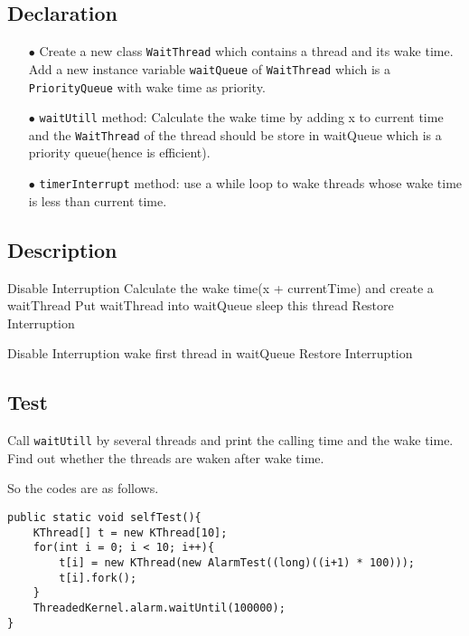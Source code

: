 \documentclass{article}
\begin{document}
\subsection{Declaration}
\begin{enumerate}
	\item[$\bullet$] Create a new class \texttt{WaitThread} which contains a thread and its wake time. 
Add a new instance variable \texttt{waitQueue} of \texttt{WaitThread} which is a \texttt{PriorityQueue} with wake time as priority. 
	\item[$\bullet$] \texttt{waitUtill} method: Calculate the wake time by adding x to current time and the \texttt{WaitThread} of the thread
		should be store in waitQueue which is a priority queue(hence is efficient).
	\item[$\bullet$] \texttt{timerInterrupt} method: use a while loop to wake threads whose wake time is less than current time.
\end{enumerate}
\subsection{Description}
\begin{algorithm}
  \begin{algorithmic}
			\State Disable Interruption
			\State Calculate the wake time(x + currentTime) and create a waitThread
			\State Put waitThread into waitQueue
			\State sleep this thread
			\State Restore Interruption
		\EndProcedure
  \end{algorithmic}
	\begin{algorithmic}
			\State Disable Interruption
					\State wake first thread in waitQueue
			\EndWhile
			\State Restore Interruption
		\EndProcedure
  \end{algorithmic}
\end{algorithm}
 \subsection{Test}
 Call \texttt{waitUtill} by several threads and print the calling time and the wake time. Find out whether the threads are waken after wake time. 
 
 So the codes are as follows.
 \begin{lstlisting}
public static void selfTest(){
	KThread[] t = new KThread[10];
	for(int i = 0; i < 10; i++){
		t[i] = new KThread(new AlarmTest((long)((i+1) * 100)));
		t[i].fork();
	}
	ThreadedKernel.alarm.waitUntil(100000);
}
 \end{lstlisting}
 
\end{document}
